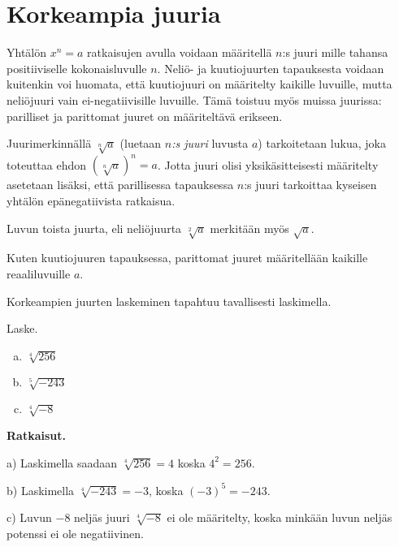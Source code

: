 \section{Korkeampia juuria}


Yhtälön $x^n=a$ ratkaisujen avulla voidaan määritellä $n$:s juuri mille tahansa positiiviselle kokonaisluvulle $n$. Neliö- ja kuutiojuurten tapauksesta voidaan kuitenkin voi huomata, että kuutiojuuri on määritelty kaikille luvuille, mutta neliöjuuri vain ei-negatiivisille luvuille. Tämä toistuu myös muissa juurissa: parilliset ja parittomat juuret on määriteltävä erikseen.

Juurimerkinnällä $\sqrt[n]{a}$ (luetaan \emph{$n$:s juuri} luvusta $a$) tarkoitetaan lukua, joka toteuttaa ehdon $(\sqrt[n]{a})^n = a$. Jotta juuri olisi yksikäsitteisesti määritelty asetetaan lisäksi, että parillisessa tapauksessa $n$:s juuri tarkoittaa kyseisen yhtälön epänegatiivista ratkaisua.




Luvun toista juurta, eli neliöjuurta $\sqrt[2]{a}$ merkitään myös $\sqrt{a}$.


Kuten kuutiojuuren tapauksessa, parittomat juuret määritellään kaikille reaaliluvuille $a$.


Korkeampien juurten laskeminen tapahtuu tavallisesti laskimella.

\begin{esimerkki}
Laske.
\begin{enumerate}[a)]
\item $\sqrt[4]{256}$
\item $\sqrt[5]{-243}$
\item $\sqrt[4]{-8}$
\end{enumerate}

{\bf Ratkaisut.}

a) Laskimella saadaan $\sqrt[4]{256}=4$ koska $4^2=256$.

b) Laskimella $\sqrt[4]{-243}=-3$, koska $(-3)^5=-243$.

c) Luvun $-8$ neljäs juuri $\sqrt[4]{-8}$ ei ole määritelty, koska minkään luvun neljäs potenssi ei ole negatiivinen.
\end{esimerkki}

